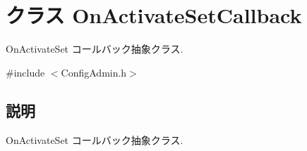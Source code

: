 \section{クラス OnActivateSetCallback}
\label{classOnActivateSetCallback}


OnActivateSet コールバック抽象クラス.  




{\ttfamily \#include $<$ConfigAdmin.h$>$}



\subsection{説明}
OnActivateSet コールバック抽象クラス. 